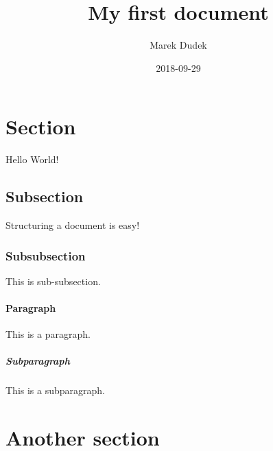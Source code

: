 \documentclass{article}
\title{My first document}
\date{2018-09-29}
\author{Marek Dudek}
\begin{document}
    \maketitle
    \newpage
    \section{Section}
    Hello World!
    \subsection{Subsection}
    Structuring a document is easy!
    \subsubsection{Subsubsection}
    This is sub-subsection.
    \paragraph{Paragraph}
    This is a paragraph.
    \subparagraph{Subparagraph}
    This is a subparagraph.
    \section{Another section}
\end{document}
